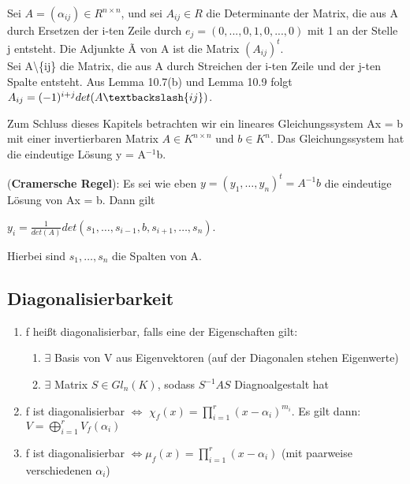 \begin{definition}
Sei $A = (\alpha_{ij}) \in R^{n \times n}$, und sei $A_{ij} \in R$ die Determinante der Matrix, die aus A durch Ersetzen der i-ten Zeile durch $e_j = (0,...,0,1,0,...,0)$ mit 1 an der Stelle j entsteht. Die Adjunkte \~{A} von A ist die Matrix $(A_{ij})^t$.\\
Sei A\textbackslash\{ij\} die Matrix, die aus A durch Streichen der i-ten Zeile und der j-ten Spalte entsteht. Aus Lemma 10.7(b) und Lemma 10.9 folgt $A_{ij} =(-1)^{i+j} det(A\textbackslash\{ij\})$.
\end{definition}

Zum Schluss dieses Kapitels betrachten wir ein lineares Gleichungssystem Ax = b mit einer invertierbaren Matrix $A \in K^{n \times n}$ und $b \in K^n$. Das Gleichungssystem hat die eindeutige Lösung y = A$^{-1}$b.

\begin{theorem}
(\textbf{Cramersche Regel}): Es sei wie eben $y = (y_1, …, y_n)^t = A^{-1}b$ die eindeutige Lösung von Ax = b. Dann gilt
\begin{center}
$y_i = \frac{1}{det(A)} det(s_1, …, s_{i-1}, b, s_{i+1}, …, s_n)$.
\end{center}
Hierbei sind $s_1, …, s_n$ die Spalten von A.
\end{theorem}

\subsection{Diagonalisierbarkeit}

\begin{theorem}
\leavevmode
\begin{enumerate}
	\item f heißt diagonalisierbar, falls eine der Eigenschaften gilt:
	\begin{enumerate}
		\item $\exists$ Basis von V aus Eigenvektoren (auf der Diagonalen stehen Eigenwerte)
		\item $\exists$ Matrix $S \in Gl_n(K)$, sodass $S^{-1}AS$ Diagnoalgestalt hat
	\end{enumerate}
	\item f ist diagonalisierbar $\Leftrightarrow$ $\chi_f(x) = \prod \limits_{i=1}^{r} (x- \alpha_i)^{m_i}$. Es gilt dann: $V=\bigoplus \limits_{i=1}^r V_f(\alpha_i)$
	\item f ist diagonalisierbar $\Leftrightarrow \mu_f(x) = \prod \limits_{i=1}^{r}(x-\alpha_i)$ (mit paarweise verschiedenen $\alpha_i$) 
\end{enumerate}
\end{theorem}



